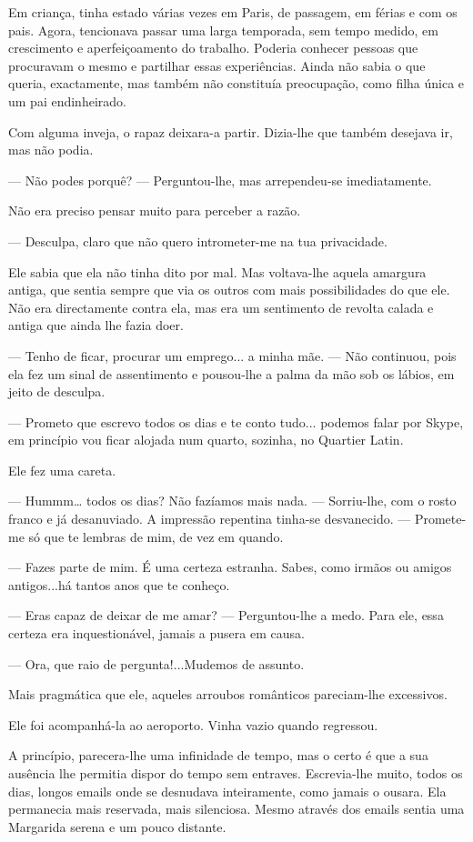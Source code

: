 Em criança, tinha estado várias vezes em Paris, de passagem, em férias e
com os pais. Agora, tencionava passar uma larga temporada, sem tempo
medido, em crescimento e aperfeiçoamento do trabalho. Poderia conhecer
pessoas que procuravam o mesmo e partilhar essas experiências. Ainda não
sabia o que queria, exactamente, mas também não constituía preocupação,
como filha única e um pai endinheirado.

Com alguma inveja, o rapaz deixara-a partir. Dizia-lhe que também
desejava ir, mas não podia.

--- Não podes porquê? --- Perguntou-lhe, mas arrependeu-se imediatamente.

Não era preciso pensar muito para perceber a razão.

--- Desculpa, claro que não quero intrometer-me na tua privacidade.

Ele sabia que ela não tinha dito por mal. Mas voltava-lhe aquela
amargura antiga, que sentia sempre que via os outros com mais
possibilidades do que ele. Não era directamente contra ela, mas era um
sentimento de revolta calada e antiga que ainda lhe fazia doer.

--- Tenho de ficar, procurar um emprego... a minha mãe. --- Não continuou,
pois ela fez um sinal de assentimento e pousou-lhe a palma da mão sob os
lábios, em jeito de desculpa.

--- Prometo que escrevo todos os dias e te conto tudo... podemos falar por
Skype, em princípio vou ficar alojada num quarto, sozinha, no Quartier
Latin.

Ele fez uma careta.

--- Hummm\ldots{} todos os dias? Não fazíamos mais nada. --- Sorriu-lhe, com
o rosto franco e já desanuviado. A impressão repentina tinha-se
desvanecido. --- Promete-me só que te lembras de mim, de vez em quando.

--- Fazes parte de mim. É uma certeza estranha. Sabes, como irmãos ou
amigos antigos...há tantos anos que te conheço.

--- Eras capaz de deixar de me amar? --- Perguntou-lhe a medo. Para ele,
essa certeza era inquestionável, jamais a pusera em causa.

--- Ora, que raio de pergunta!...Mudemos de assunto.

Mais pragmática que ele, aqueles arroubos românticos pareciam-lhe
excessivos.

Ele foi acompanhá-la ao aeroporto. Vinha vazio quando regressou.

A princípio, parecera-lhe uma infinidade de tempo, mas o certo é que a
sua ausência lhe permitia dispor do tempo sem entraves. Escrevia-lhe
muito, todos os dias, longos emails onde se desnudava inteiramente, como
jamais o ousara. Ela permanecia mais reservada, mais silenciosa. Mesmo
através dos emails sentia uma Margarida serena e um pouco distante.

